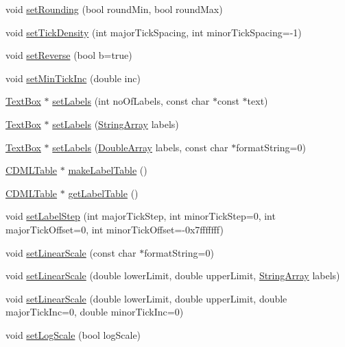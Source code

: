 \begin{DoxyCompactItemize}
\item 
void \hyperlink{class_axis_a7e296867580eabe94b1b80abb5318762}{set\+Rounding} (bool round\+Min, bool round\+Max)
\item 
void \hyperlink{class_axis_abdb7eae83d8e09c6eb9583a9cabf00d2}{set\+Tick\+Density} (int major\+Tick\+Spacing, int minor\+Tick\+Spacing=-\/1)
\item 
void \hyperlink{class_axis_ab18969dbb7b9f59e170b7b5e72c4208e}{set\+Reverse} (bool b=true)
\item 
void \hyperlink{class_axis_aa3fc0eaec64e538742f6ca74c1540c88}{set\+Min\+Tick\+Inc} (double inc)
\item 
\hyperlink{class_text_box}{Text\+Box} $\ast$ \hyperlink{class_axis_a95b7b98d0085dcbe709ec0c0f7df76c1}{set\+Labels} (int no\+Of\+Labels, const char $\ast$const $\ast$text)
\item 
\hyperlink{class_text_box}{Text\+Box} $\ast$ \hyperlink{class_axis_a6259ea2b433580896ac821ff442e8efe}{set\+Labels} (\hyperlink{class_string_array}{String\+Array} labels)
\item 
\hyperlink{class_text_box}{Text\+Box} $\ast$ \hyperlink{class_axis_a4e7ea5b86e98eabc102851790543d119}{set\+Labels} (\hyperlink{class_double_array}{Double\+Array} labels, const char $\ast$format\+String=0)
\item 
\hyperlink{class_c_d_m_l_table}{C\+D\+M\+L\+Table} $\ast$ \hyperlink{class_axis_afeb924f4756aa7cb704fadf041cd548c}{make\+Label\+Table} ()
\item 
\hyperlink{class_c_d_m_l_table}{C\+D\+M\+L\+Table} $\ast$ \hyperlink{class_axis_a5c187793e791bd6e5ce8ee1f63a114e8}{get\+Label\+Table} ()
\item 
void \hyperlink{class_axis_a111155ffdce1d11e8896e5f185a7b753}{set\+Label\+Step} (int major\+Tick\+Step, int minor\+Tick\+Step=0, int major\+Tick\+Offset=0, int minor\+Tick\+Offset=-\/0x7fffffff)
\item 
void \hyperlink{class_axis_a69fe2919bd8bcf21a5139dc1e0a511c4}{set\+Linear\+Scale} (const char $\ast$format\+String=0)
\item 
void \hyperlink{class_axis_af149d48d3168531e48ef42f99695b8b7}{set\+Linear\+Scale} (double lower\+Limit, double upper\+Limit, \hyperlink{class_string_array}{String\+Array} labels)
\item 
void \hyperlink{class_axis_a1c02cb45cc6f4d01d0b420298ebe668c}{set\+Linear\+Scale} (double lower\+Limit, double upper\+Limit, double major\+Tick\+Inc=0, double minor\+Tick\+Inc=0)
\item 
void \hyperlink{class_axis_a3222aeb4e534dbe9c1ffa68cb11a47b8}{set\+Log\+Scale} (bool log\+Scale)

\end{DoxyCompactItemize}
